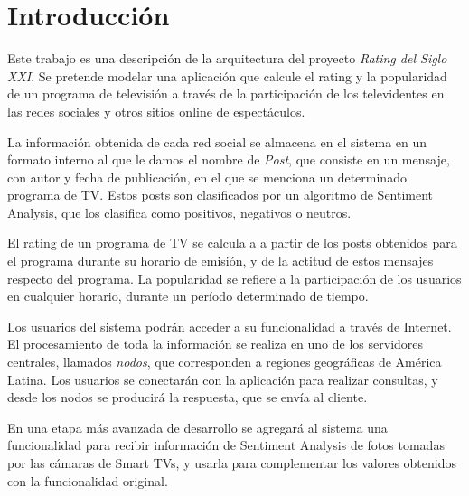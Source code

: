 
\section{Introducción}


Este trabajo es una descripción de la arquitectura del proyecto \emph{Rating del Siglo XXI}. Se pretende modelar una aplicación que calcule el rating y la popularidad de un programa de televisión a través de la participación de los televidentes en las redes sociales y otros sitios online de espectáculos. 

La información obtenida de cada red social se almacena en el sistema en un formato interno al que le damos el nombre de \emph{Post}, que consiste en un mensaje, con autor y fecha de publicación, en el que se menciona un determinado programa de TV. Estos posts son clasificados por un algoritmo de Sentiment Analysis, que los clasifica como positivos, negativos o neutros.

El rating de un programa de TV se calcula a a partir de los posts obtenidos para el programa durante su horario de emisión, y de la actitud de estos mensajes respecto del programa. La popularidad se refiere a la participación de los usuarios en cualquier horario, durante un período determinado de tiempo.

Los usuarios del sistema podrán acceder a su funcionalidad a través de Internet. El procesamiento de toda la información se realiza en uno de los servidores centrales, llamados \emph{nodos}, que corresponden a regiones geográficas de América Latina. Los usuarios se conectarán con la aplicación para realizar consultas, y desde los nodos se producirá la respuesta, que se envía al cliente.

En una etapa más avanzada de desarrollo se agregará al sistema una funcionalidad para recibir información de Sentiment Analysis de fotos tomadas por las cámaras de Smart TVs, y usarla para complementar los valores obtenidos con la funcionalidad original.
